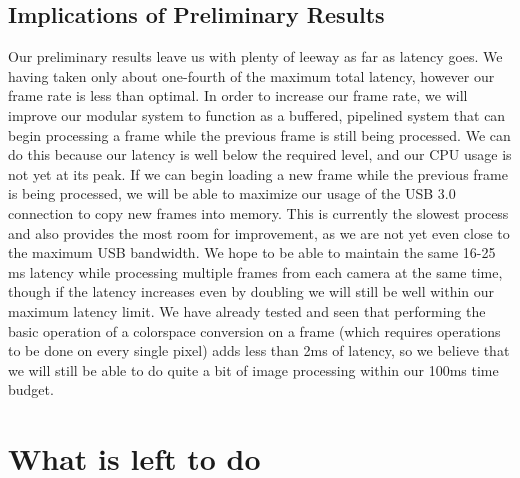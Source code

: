 \documentclass[letterpaper,10pt,titlepage]{IEEEtran}
\begin{document}
  \subsection{Implications of Preliminary Results}
  Our preliminary results leave us with plenty of leeway as far as latency goes. We having taken only about one-fourth of the maximum total latency, however our frame rate is less than optimal. In order to increase our frame rate, we will improve our modular system to function as a buffered, pipelined system that can begin processing a frame while the previous frame is still being processed. We can do this because our latency is well below the required level, and our CPU usage is not yet at its peak. If we can begin loading a new frame while the previous frame is being processed, we will be able to maximize our usage of the USB 3.0 connection to copy new frames into memory. This is currently the slowest process and also provides the most room for improvement, as we are not yet even close to the maximum USB bandwidth. We hope to be able to maintain the same 16-25 ms latency while processing multiple frames from each camera at the same time, though if the latency increases even by doubling we will still be well within our maximum latency limit. We have already tested and seen that performing the basic operation of a colorspace conversion on a frame (which requires operations to be done on every single pixel) adds less than 2ms of latency, so we believe that we will still be able to do quite a bit of image processing within our 100ms time budget.
  
  \section{What is left to do}
\end{document}
